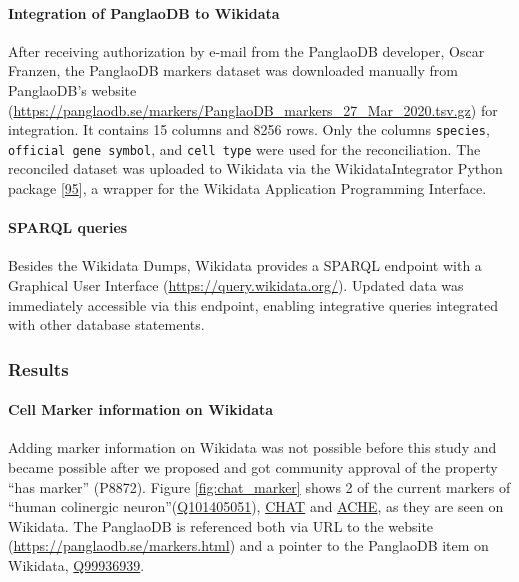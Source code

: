 \hypertarget{integration-of-panglaodb-to-wikidata}{%
\paragraph{Integration of PanglaoDB to Wikidata}\label{integration-of-panglaodb-to-wikidata}}

After receiving authorization by e-mail from the PanglaoDB developer, Oscar Franzen, the PanglaoDB markers dataset was downloaded manually from PanglaoDB's website (\url{https://panglaodb.se/markers/PanglaoDB_markers_27_Mar_2020.tsv.gz}) for integration. It contains 15 columns and 8256 rows. Only the columns \texttt{species}, \texttt{official\ gene\ symbol}, and \texttt{cell\ type} were used for the reconciliation.
The reconciled dataset was uploaded to Wikidata via the WikidataIntegrator Python package {[}\protect\hyperlink{ref-qDI8I4IJ}{95}{]}, a wrapper for the Wikidata Application Programming Interface.

\hypertarget{sparql-queries}{%
\paragraph{SPARQL queries}\label{sparql-queries}}

Besides the Wikidata Dumps, Wikidata provides a SPARQL endpoint with a Graphical User Interface (\url{https://query.wikidata.org/}).
Updated data was immediately accessible via this endpoint, enabling integrative queries integrated with other database statements.

\hypertarget{results}{%
\subsubsection{Results}\label{results}}

\hypertarget{cell-marker-information-on-wikidata}{%
\paragraph{Cell Marker information on Wikidata}\label{cell-marker-information-on-wikidata}}

Adding marker information on Wikidata was not possible before this study and became possible after we proposed and got community approval of the property ``has marker'' (P8872).
Figure \ref{fig:chat_marker} shows 2 of the current markers of ``human colinergic neuron''(\href{http://www.wikidata.org/entity/Q101405051}{Q101405051}), \href{http://www.wikidata.org/entity/Q14863671}{CHAT} and \href{http://www.wikidata.org/entity/Q407983}{ACHE}, as they are seen on Wikidata.
The PanglaoDB is referenced both via URL to the website (\url{https://panglaodb.se/markers.html}) and a pointer to the PanglaoDB item on Wikidata, \href{http://www.wikidata.org/entity/Q99936939}{Q99936939}.

